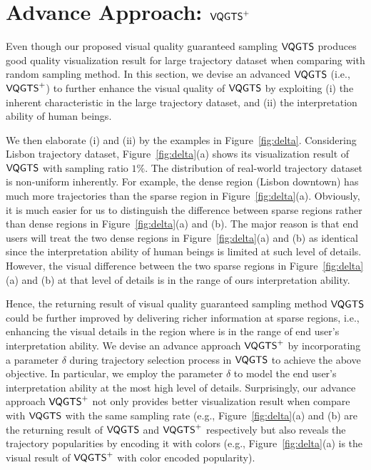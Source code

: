 




\section{Advance Approach: $\mathsf{VQGTS}^{+}$}


Even though our proposed visual quality guaranteed sampling $\mathsf{VQGTS}$ produces good quality visualization result for large trajectory dataset when comparing with random sampling method.
In this section, we devise an advanced $\mathsf{VQGTS}$ (i.e., $\mathsf{VQGTS}^{+}$) to further enhance the visual quality of $\mathsf{VQGTS}$ by exploiting
(i) the inherent characteristic in the large trajectory dataset, and (ii) the interpretation ability of human beings.

We then elaborate (i) and (ii) by the examples in Figure~\ref{fig:delta}.
Considering Lisbon trajectory dataset, Figure~\ref{fig:delta}(a) shows its visualization result of $\mathsf{VQGTS}$ with sampling ratio $1\%$.
The distribution of real-world trajectory dataset is non-uniform inherently.
For example, the dense region (Lisbon downtown) has much more trajectories than the sparse region in Figure~\ref{fig:delta}(a).
Obviously, it is much easier for us to distinguish the difference between sparse regions rather than dense regions in Figure~\ref{fig:delta}(a) and (b).
The major reason is that end users will treat the two dense regions in Figure~\ref{fig:delta}(a) and (b) as identical
since the interpretation ability of human beings is limited at such level of details.
However, the visual difference between the two sparse regions in Figure~\ref{fig:delta}(a) and (b) at that level of details is in the range of ours interpretation ability.

Hence, the returning result of visual quality guaranteed sampling method $\mathsf{VQGTS}$ could be further improved by delivering richer information at sparse regions, 
i.e., enhancing the visual details in the region where is in the range of end user's interpretation ability.
We devise an advance approach $\mathsf{VQGTS}^{+}$ by incorporating a parameter $\delta$ during trajectory selection process in $\mathsf{VQGTS}$ to achieve the above objective.
In particular, we employ the parameter $\delta$ to model the end user's interpretation ability at the most high level of details.
Surprisingly, our advance approach $\mathsf{VQGTS}^{+}$ not only provides better visualization result when compare with $\mathsf{VQGTS}$ with the same sampling rate
(e.g., Figure~\ref{fig:delta}(a) and (b) are the returning result of $\mathsf{VQGTS}$ and $\mathsf{VQGTS}^{+}$ respectively
but also reveals the trajectory popularities by encoding it with colors (e.g., Figure~\ref{fig:delta}(a) is the visual result of $\mathsf{VQGTS}^{+}$ with color encoded popularity).












